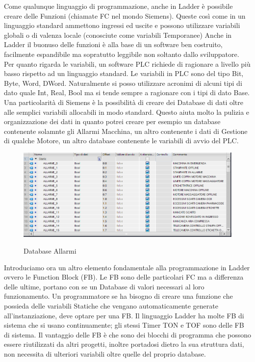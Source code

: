 \documentclass[12pt, a4paper, oneside]{book}
\begin{document}
	
	Come qualunque linguaggio di programmazione, anche in Ladder è possibile creare delle Funzioni (chiamate FC nel mondo Siemens). Queste così come in un linguaggio standard ammettono ingressi ed uscite e possono utilizzare variabili globali o di valenza locale (conosciute come variabili Temporanee) Anche in Ladder il buonuso delle funzioni è alla base di un software ben costruito, facilmente espandibile ma sopratutto leggibile non soltanto dallo sviluppatore. Per quanto rigarda le variabili, un software PLC richiede di ragionare a livello più basso rispetto ad un linguaggio standard. Le variabili in PLC sono del tipo Bit, Byte, Word, DWord. Naturalmente si posso utilizzare acronimi di alcuni tipi di dato quale Int, Real, Bool ma si tende sempre a ragionare con i tipi di dato Base. 
	\\Una particolarità di Siemens è la possibilità di creare dei Database di dati oltre alle semplici variabili allocabili in modo standard. Questo aiuta molto la pulizia e organizzazione dei dati in quanto potrei creare per esempio un database contenente solamnte gli Allarmi Macchina, un altro contenente i dati di Gestione di qualche Motore, un altro database contenente le variabili di avvio del PLC. 
	
	\begin{figure}[H]
	\centering
	\includegraphics[width=12cm]{Immagini/LAD4}
	\label{lad4}
	\caption{Database Allarmi}
	\end{figure}

	Introduciamo ora un altro elemento fondamentale alla programmazione in Ladder ovvero le Function Block (FB). Le FB sono delle particolari FC ma a differenza delle ultime, portano con se un Database di valori necessari al loro funzionamento. Un programmatore se ha bisogno di creare una funzione che possieda delle variabili Statiche che vengano automaticamente generate all'instanziazione, deve optare per una FB. Il linguaggio Ladder ha molte FB di sistema che si usano continuamente; gli stessi Timer TON e TOF sono delle FB di sistema. Il vantaggio delle FB è che sono dei blocchi di programma che possono essere riutilizzati da altri progetti, inoltre portadosi dietro la sua struttura dati, non necessita di ulteriori variabili oltre quelle del proprio database.
\end{document}
